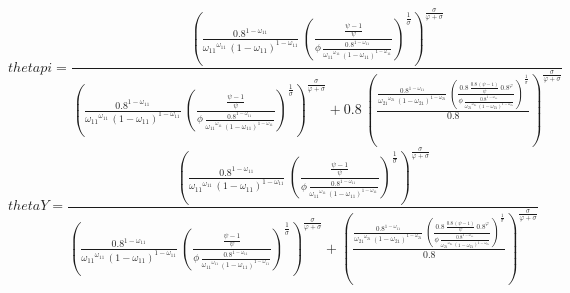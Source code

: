 \begin{dmath*}
thetapi = \frac{\left(\frac{0.8^{1-{{\omega_{11}}}}}{{{\omega_{11}}}^{{{\omega_{11}}}}\, \left(1-{{\omega_{11}}}\right)^{1-{{\omega_{11}}}}}\, \left(\frac{\frac{{{\psi}}-1}{{{\psi}}}}{{{\phi}}\, \frac{0.8^{1-{{\omega_{11}}}}}{{{\omega_{11}}}^{{{\omega_{11}}}}\, \left(1-{{\omega_{11}}}\right)^{1-{{\omega_{11}}}}}}\right)^{\frac{1}{{{\sigma}}}}\right)^{\frac{{{\sigma}}}{{{\varphi}}+{{\sigma}}}}}{\left(\frac{0.8^{1-{{\omega_{11}}}}}{{{\omega_{11}}}^{{{\omega_{11}}}}\, \left(1-{{\omega_{11}}}\right)^{1-{{\omega_{11}}}}}\, \left(\frac{\frac{{{\psi}}-1}{{{\psi}}}}{{{\phi}}\, \frac{0.8^{1-{{\omega_{11}}}}}{{{\omega_{11}}}^{{{\omega_{11}}}}\, \left(1-{{\omega_{11}}}\right)^{1-{{\omega_{11}}}}}}\right)^{\frac{1}{{{\sigma}}}}\right)^{\frac{{{\sigma}}}{{{\varphi}}+{{\sigma}}}}+0.8\, \left(\frac{\frac{0.8^{1-{{\omega_{11}}}}}{{{\omega_{21}}}^{{{\omega_{21}}}}\, \left(1-{{\omega_{21}}}\right)^{1-{{\omega_{21}}}}}\, \left(\frac{0.8\, \frac{0.8\, \left({{\psi}}-1\right)}{{{\psi}}}\, 0.8^{{{\varphi}}}}{{{\phi}}\, \frac{0.8^{1-{{\omega_{11}}}}}{{{\omega_{21}}}^{{{\omega_{21}}}}\, \left(1-{{\omega_{21}}}\right)^{1-{{\omega_{21}}}}}}\right)^{\frac{1}{{{\sigma}}}}}{0.8}\right)^{\frac{{{\sigma}}}{{{\varphi}}+{{\sigma}}}}}
\end{dmath*}
\begin{dmath*}
thetaY = \frac{\left(\frac{0.8^{1-{{\omega_{11}}}}}{{{\omega_{11}}}^{{{\omega_{11}}}}\, \left(1-{{\omega_{11}}}\right)^{1-{{\omega_{11}}}}}\, \left(\frac{\frac{{{\psi}}-1}{{{\psi}}}}{{{\phi}}\, \frac{0.8^{1-{{\omega_{11}}}}}{{{\omega_{11}}}^{{{\omega_{11}}}}\, \left(1-{{\omega_{11}}}\right)^{1-{{\omega_{11}}}}}}\right)^{\frac{1}{{{\sigma}}}}\right)^{\frac{{{\sigma}}}{{{\varphi}}+{{\sigma}}}}}{\left(\frac{0.8^{1-{{\omega_{11}}}}}{{{\omega_{11}}}^{{{\omega_{11}}}}\, \left(1-{{\omega_{11}}}\right)^{1-{{\omega_{11}}}}}\, \left(\frac{\frac{{{\psi}}-1}{{{\psi}}}}{{{\phi}}\, \frac{0.8^{1-{{\omega_{11}}}}}{{{\omega_{11}}}^{{{\omega_{11}}}}\, \left(1-{{\omega_{11}}}\right)^{1-{{\omega_{11}}}}}}\right)^{\frac{1}{{{\sigma}}}}\right)^{\frac{{{\sigma}}}{{{\varphi}}+{{\sigma}}}}+\left(\frac{\frac{0.8^{1-{{\omega_{11}}}}}{{{\omega_{21}}}^{{{\omega_{21}}}}\, \left(1-{{\omega_{21}}}\right)^{1-{{\omega_{21}}}}}\, \left(\frac{0.8\, \frac{0.8\, \left({{\psi}}-1\right)}{{{\psi}}}\, 0.8^{{{\varphi}}}}{{{\phi}}\, \frac{0.8^{1-{{\omega_{11}}}}}{{{\omega_{21}}}^{{{\omega_{21}}}}\, \left(1-{{\omega_{21}}}\right)^{1-{{\omega_{21}}}}}}\right)^{\frac{1}{{{\sigma}}}}}{0.8}\right)^{\frac{{{\sigma}}}{{{\varphi}}+{{\sigma}}}}}
\end{dmath*}

